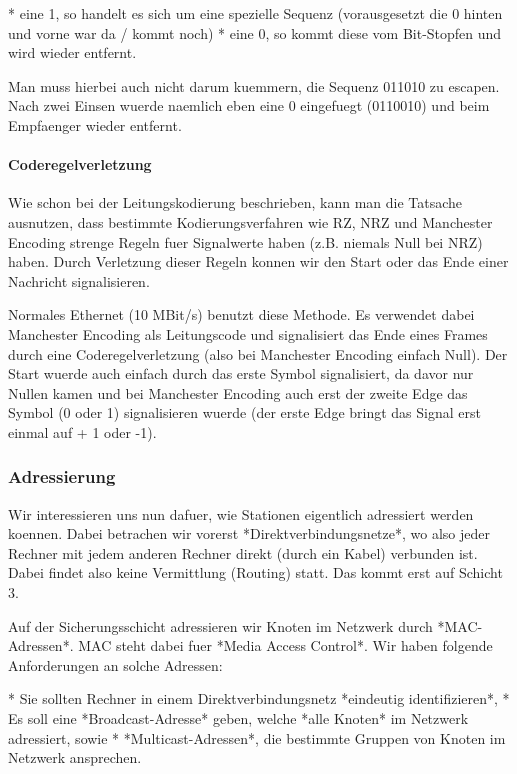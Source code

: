 * eine 1, so handelt es sich um eine spezielle Sequenz (vorausgesetzt die 0
  hinten und vorne war da / kommt noch)
* eine 0, so kommt diese vom Bit-Stopfen und wird wieder entfernt.

Man muss hierbei auch nicht darum kuemmern, die Sequenz 011010 zu escapen. Nach
zwei Einsen wuerde naemlich eben eine 0 eingefuegt (0110010) und beim Empfaenger
wieder entfernt.

\paragraph{Coderegelverletzung} 

Wie schon bei der Leitungskodierung beschrieben, kann man die Tatsache
ausnutzen, dass bestimmte Kodierungsverfahren wie RZ, NRZ und Manchester
Encoding strenge Regeln fuer Signalwerte haben (z.B. niemals Null bei NRZ)
haben. Durch Verletzung dieser Regeln konnen wir den Start oder das Ende einer
Nachricht signalisieren.

Normales Ethernet (10 MBit/s) benutzt diese Methode. Es verwendet dabei
Manchester Encoding als Leitungscode und signalisiert das Ende eines Frames
durch eine Coderegelverletzung (also bei Manchester Encoding einfach Null). Der
Start wuerde auch einfach durch das erste Symbol signalisiert, da davor nur
Nullen kamen und bei Manchester Encoding auch erst der zweite Edge das Symbol (0
oder 1) signalisieren wuerde (der erste Edge bringt das Signal erst einmal auf +
1 oder -1).

\subsubsection{Adressierung} 

Wir interessieren uns nun dafuer, wie Stationen eigentlich adressiert werden
koennen. Dabei betrachen wir vorerst *Direktverbindungsnetze*, wo also jeder
Rechner mit jedem anderen Rechner direkt (durch ein Kabel) verbunden ist. Dabei
findet also keine Vermittlung (Routing) statt. Das kommt erst auf Schicht 3.

Auf der Sicherungsschicht adressieren wir Knoten im Netzwerk durch
*MAC-Adressen*. MAC steht dabei fuer *Media Access Control*. Wir haben folgende
Anforderungen an solche Adressen:

* Sie sollten Rechner in einem Direktverbindungsnetz *eindeutig identifizieren*,
* Es soll eine *Broadcast-Adresse* geben, welche *alle Knoten* im Netzwerk
  adressiert, sowie
* *Multicast-Adressen*, die bestimmte Gruppen von Knoten im Netzwerk ansprechen.

